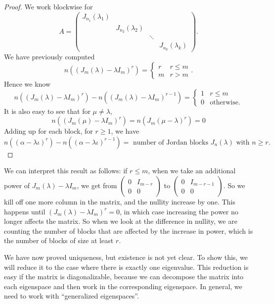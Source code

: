 \documentclass[a4paper]{article}
\begin{document}
\begin{proof}
  We work blockwise for
  \[
    A =
    \begin{pmatrix}
      J_{n_1}(\lambda_1)\\
      & J_{n_2}(\lambda_2)\\
      & & \ddots\\\
      & & & J_{n_k} (\lambda_k)
    \end{pmatrix}.
  \]
  We have previously computed
  \[
    n((J_m(\lambda) - \lambda I_m)^r) =
    \begin{cases}
      r & r \leq m\\
      m & r > m
    \end{cases}.
  \]
  Hence we know
  \[
    n((J_m(\lambda) - \lambda I_m)^r) - n((J_m(\lambda) - \lambda I_m)^{r - 1}) =
    \begin{cases}
      1 & r \leq m\\
      0 & \text{otherwise}.
    \end{cases}
  \]
  It is also easy to see that for $\mu \not= \lambda$,
  \[
    n((J_m(\mu) - \lambda I_m)^r) = n(J_m(\mu - \lambda)^r) = 0
  \]
  Adding up for each block, for $r \geq 1$, we have
  \[
    n((\alpha - \lambda \iota)^r) - n((\alpha - \lambda \iota)^{r - 1}) =\text{ number of Jordan blocks }J_n(\lambda)\text{ with } n \geq r.
  \]
\end{proof}
We can interpret this result as follows: if $r \leq m$, when we take an additional power of $J_m(\lambda) - \lambda I_m$, we get from $\begin{pmatrix}0 & I_{m - r}\\ 0 & 0\end{pmatrix}$ to $\begin{pmatrix}0 & I_{m - r - 1}\\ 0 & 0\end{pmatrix}$. So we kill off one more column in the matrix, and the nullity increase by one. This happens until $(J_m(\lambda) - \lambda I_m)^r = 0$, in which case increasing the power no longer affects the matrix. So when we look at the difference in nullity, we are counting the number of blocks that are affected by the increase in power, which is the number of blocks of size at least $r$.

We have now proved uniqueness, but existence is not yet clear. To show this, we will reduce it to the case where there is exactly one eigenvalue. This reduction is easy if the matrix is diagonalizable, because we can decompose the matrix into each eigenspace and then work in the corresponding eigenspace. In general, we need to work with ``generalized eigenspaces''.
\end{document}
